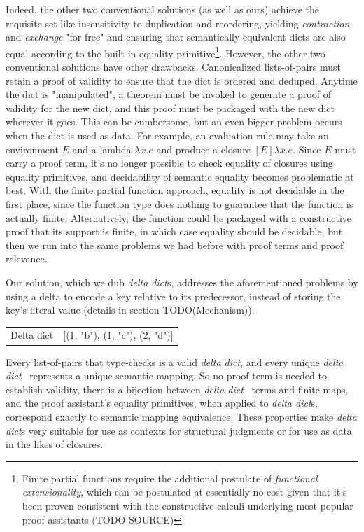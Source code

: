 \documentclass[nonacm]{acmart}
\newcommand{\dd}{\emph{delta dict}}
\theoremstyle{slplain}
\numberwithin{thm}{section}
\begin{document}
Indeed, the other two conventional solutions (as well as ours) achieve the requisite set-like insensitivity
to duplication and reordering, yielding \emph{contraction} and \emph{exchange} "for free" and ensuring that
semantically equivalent dicts are also equal according to the built-in equality primitive\footnote{Finite partial
functions require the additional postulate of \emph{functional extensionality}, which can be postulated
at essentially no cost given that it's been proven consistent with the constructive calculi underlying most
popular proof assistants (TODO SOURCE)}. However, the other two conventional solutions have other drawbacks.
Canonicalized lists-of-pairs must retain a proof of validity to ensure that the dict is ordered and deduped.
Anytime the dict is "manipulated", a theorem must be invoked to generate a proof of validity for the new dict,
and this proof must be packaged with the new dict wherever it goes. This can be cumbersome, but an even bigger
problem occurs when the dict is used as data. For example, an evaluation rule may take an environment $E$ and
a lambda $\lambda x . e$ and produce a closure $[E] \lambda x . e$. Since $E$ must carry a proof term, it's no
longer possible to check equality of closures using equality primitives, and decidability of semantic equality
becomes problematic at best. With the finite partial function approach, equality is not decidable in the first
place, since the function type does nothing to guarantee that the function is actually finite.
Alternatively, the function could be packaged with a constructive proof that its support is finite, in which
case equality should be decidable, but then we run into the same problems we had before with proof terms and
proof relevance.

Our solution, which we dub {\dd}s, addresses the aforementioned problems by using a delta to
encode a key relative to its predecessor, instead of storing the key's literal value (details in section TODO(Mechanism)).
\\
\begin{tabular}{ l l }
 \quad\quad Delta dict & [(1, "b"), (1, "c"), (2, "d")]
\end{tabular}

Every list-of-pairs that type-checks is a valid \dd, and every unique \dd~ represents
a unique semantic mapping. So no proof term is needed to establish validity, there is a bijection between
\dd~ terms and finite maps, and the proof assistant's equality primitives, when applied to {\dd}s, correspond
exactly to semantic mapping equivalence. These properties make {\dd}s very suitable for use as contexts for
structural judgments or for use as data in the likes of closures.
\end{document}
